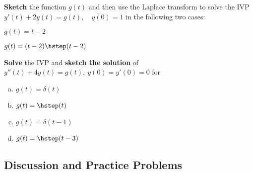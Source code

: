 \newpage\begin{question}
  \textbf{Sketch} the function \(g(t)\) and then use the Laplace transform to solve the IVP
  \(
    y'(t) + 2 y(t) = g(t),\quad y(0)=1
  \)
  in the following two cases:
  \begin{fullwidth}
  \begin{colenumerate}[2]
  \item \(g(t) = t-2\)
  \item \(g(t) = (t-2)\hstep(t-2)\)
  \end{colenumerate}
\end{fullwidth}
\solspace{4in}
\end{question}

\begin{question}
  \begin{fullwidth}
  \textbf{Solve} the IVP and \textbf{sketch the solution} of
  \(
    y''(t) + 4 y(t) = g(t),\ y(0)=y'(0)=0
  \)
  for

  \begin{enumerate}[(a)]
  \item \(g(t) = \delta(t)\) \solspace{3.5in}
  \newpage\item \(g(t) = \hstep(t)\) \solspace{3.25in}
  \item \(g(t) = \delta(t-1)\) \solspace{3.25in}
  \item \(g(t) = \hstep(t-3)\) \solspace{3.25in}
  \end{enumerate}
\end{fullwidth}

\end{question}
\subsection*{Discussion and Practice Problems}

